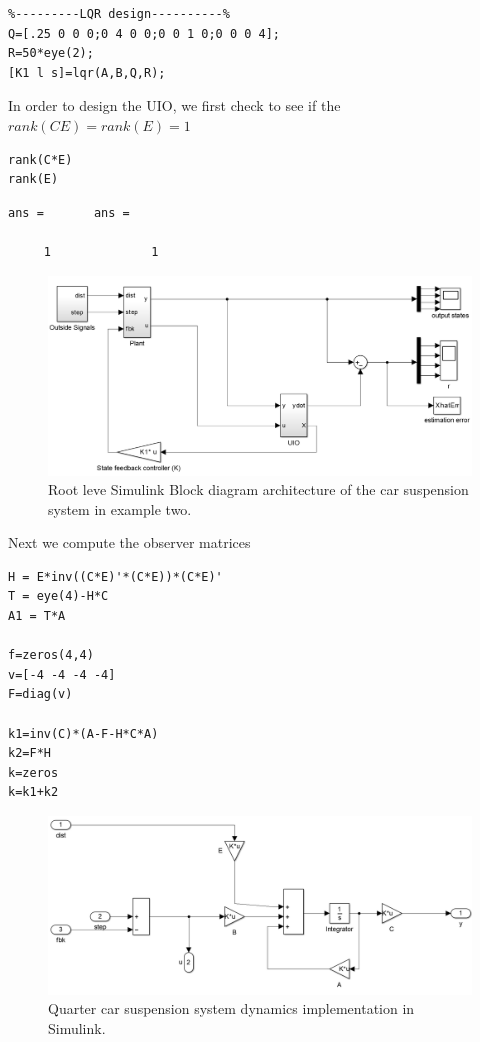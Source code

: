\documentclass{amsart}
\theoremstyle{definition}
\theoremstyle{remark}
\numberwithin{equation}{section}
\begin{document}
\begin{verbatim}
%---------LQR design----------%
Q=[.25 0 0 0;0 4 0 0;0 0 1 0;0 0 0 4];
R=50*eye(2);
[K1 l s]=lqr(A,B,Q,R);
\end{verbatim}

In order to design the UIO, we first check to see if the $rank(CE) = rank(E) = 1$
\vspace{1em}
\begin{verbatim}
rank(C*E)
rank(E)
\end{verbatim}

        \color{lightgray} \begin{verbatim}
ans =       ans =

     1              1
\end{verbatim} \color{black}

\begin{figure}[H]
    \centering
    \includegraphics[scale=.3]{carSusRootLevel.png}
    \caption{Root leve Simulink Block diagram architecture of the car suspension system in example two.}
    \label{fig:car_sus_fbd}
\end{figure}
Next we compute the observer matrices

\begin{verbatim}
H = E*inv((C*E)'*(C*E))*(C*E)'
T = eye(4)-H*C
A1 = T*A

f=zeros(4,4)
v=[-4 -4 -4 -4]
F=diag(v)

k1=inv(C)*(A-F-H*C*A)
k2=F*H
k=zeros
k=k1+k2
\end{verbatim}

\begin{figure}[H]
    \centering
    \includegraphics[scale=.4]{carSusBD.png}
    \caption{Quarter car suspension system dynamics implementation in Simulink.}
    \label{fig:carSusBD}
\end{figure}
\end{document}
